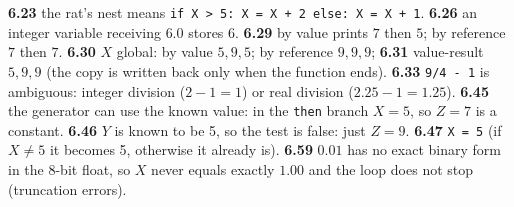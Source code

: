 \documentclass{fkt-notes}
\begin{document}
\textbf{6.23} the rat's nest means \texttt{if X > 5: X = X + 2 else: X = X + 1}. \textbf{6.26} an integer variable receiving $6.0$ stores $6$. \textbf{6.29} by value prints $7$ then $5$; by reference $7$ then $7$.
\textbf{6.30} $X$ global: by value $5, 9, 5$; by reference $9, 9, 9$; \textbf{6.31} value-result $5, 9, 9$ (the copy is written back only when the function ends).
\textbf{6.33} \texttt{9/4 - 1} is ambiguous: integer division ($2-1=1$) or real division ($2.25-1=1.25$). \textbf{6.45} the generator can use the known value: in the \texttt{then} branch $X=5$, so $Z=7$ is a constant.
\textbf{6.46} $Y$ is known to be 5, so the test is false: just $Z=9$. \textbf{6.47} \texttt{X = 5} (if $X\ne5$ it becomes 5, otherwise it already is).
\textbf{6.59} $0.01$ has no exact binary form in the 8-bit float, so $X$ never equals exactly $1.00$ and the loop does not stop (truncation errors).
\end{document}
